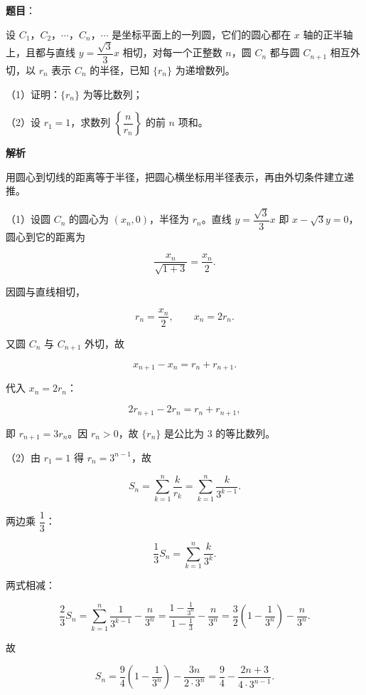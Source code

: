 \begin{answer}

\textbf{题目}：

设 $C_1$，$C_2$，$\cdots$，$C_n$，$\cdots$ 是坐标平面上的一列圆，它们的圆心都在 $x$ 轴的正半轴上，且都与直线 $y=\dfrac{\sqrt3}3x$ 相切，对每一个正整数 $n$，圆 $C_n$ 都与圆 $C_{n+1}$ 相互外切，以 $r_n$ 表示 $C_n$ 的半径，已知 $\{r_n\}$ 为递增数列。

（1）证明：$\{r_n\}$ 为等比数列；

（2）设 $r_1=1$，求数列 $\left\{\dfrac{n}{r_n}\right\}$ 的前 $n$ 项和。
\nopagebreak[4]
\begin{center}\end{center}
\nopagebreak[4]
\textbf{解析}

用圆心到切线的距离等于半径，把圆心横坐标用半径表示，再由外切条件建立递推。

（1）设圆 $C_n$ 的圆心为 $(x_n,0)$，半径为 $r_n$。直线 $y=\dfrac{\sqrt3}3x$ 即 $x-\sqrt3y=0$，圆心到它的距离为

\nopagebreak[4]
\[\frac{x_n}{\sqrt{1+3}}=\frac{x_n}2.\]

因圆与直线相切，

\nopagebreak[4]
\[r_n=\frac{x_n}2,\qquad x_n=2r_n.\]

又圆 $C_n$ 与 $C_{n+1}$ 外切，故

\nopagebreak[4]
\[x_{n+1}-x_n=r_n+r_{n+1}.\]

代入 $x_n=2r_n$：

\nopagebreak[4]
\[2r_{n+1}-2r_n=r_n+r_{n+1},\]

即 $r_{n+1}=3r_n$。因 $r_n>0$，故 $\{r_n\}$ 是公比为 $3$ 的等比数列。

（2）由 $r_1=1$ 得 $r_n=3^{n-1}$，故

\nopagebreak[4]
\[S_n=\sum_{k=1}^n\frac{k}{r_k}=\sum_{k=1}^n\frac{k}{3^{k-1}}.\]

两边乘 $\dfrac13$：

\nopagebreak[4]
\[\frac13S_n=\sum_{k=1}^n\frac{k}{3^k}.\]

两式相减：

\nopagebreak[4]
\[\frac23S_n=\sum_{k=1}^n\frac1{3^{k-1}}-\frac{n}{3^n}
=\frac{1-\frac1{3^n}}{1-\frac13}-\frac{n}{3^n}
=\frac32\left(1-\frac1{3^n}\right)-\frac{n}{3^n}.\]

故

\nopagebreak[4]
\[S_n=\frac94\left(1-\frac1{3^n}\right)-\frac{3n}{2\cdot3^n}
=\frac94-\frac{2n+3}{4\cdot3^{n-1}}.\]


\end{answer}
